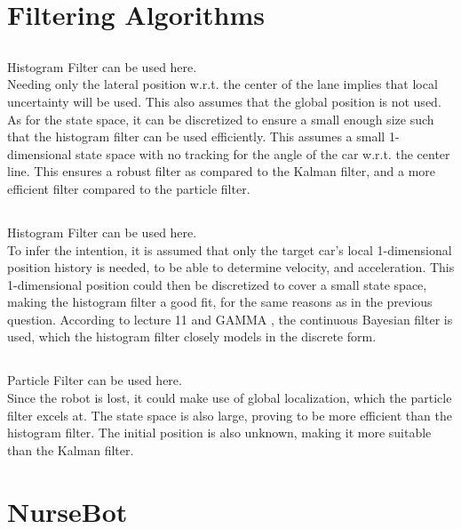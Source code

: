\newpage
\section{Filtering Algorithms}

\subsection{}
Histogram Filter can be used here.\\
Needing only the lateral position w.r.t. the center of the lane implies that
local uncertainty will be used.
This also assumes that the global position is not used.
As for the state space, it can be discretized to ensure a small enough
size such that the histogram filter can be used efficiently.
This assumes a small 1-dimensional state space with no tracking for the
angle of the car w.r.t. the center line.
This ensures a robust filter as compared to the Kalman filter,
and a more efficient filter compared to the particle filter.

\subsection{}
Histogram Filter can be used here.\\
To infer the intention, it is assumed that only the target car's local
1-dimensional position history is needed, to be able to determine
velocity, and acceleration.
This 1-dimensional position could then be discretized 
to cover a small state space,
making the histogram filter a good fit, for the same reasons
as in the previous question.
According to lecture 11 \cite{cai21} and GAMMA \cite{luo19}, 
the continuous Bayesian filter is used,
which the histogram filter closely models in the discrete form.

\subsection{}
Particle Filter can be used here.\\
Since the robot is lost, it could make use of global localization,
which the particle filter excels at.
The state space is also large, proving to be more efficient
than the histogram filter.
The initial position is also unknown, making it more suitable 
than the Kalman filter.

\newpage
\section{NurseBot}

